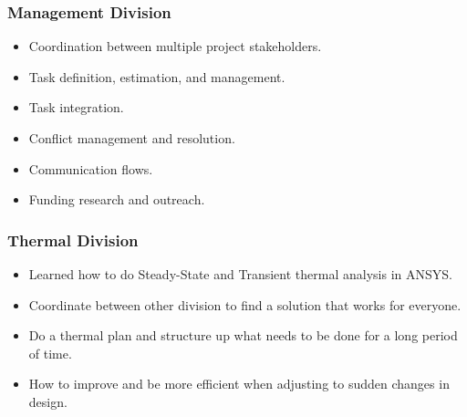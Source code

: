 \subsubsection{Management Division}

\begin{itemize}
    \item Coordination between multiple project stakeholders.
    \item Task definition, estimation, and management.
    \item Task integration.
    \item Conflict management and resolution.
    \item Communication flows.
    \item Funding research and outreach.
\end{itemize}

\subsubsection{Thermal Division}
\begin{itemize}
    \item Learned how to do Steady-State and Transient thermal analysis in ANSYS.
    \item Coordinate between other division to find a solution that works for everyone.
    \item Do a thermal plan and structure up what needs to be done for a long period of time.
    \item How to improve and be more efficient when adjusting to sudden changes in design.
\end{itemize}